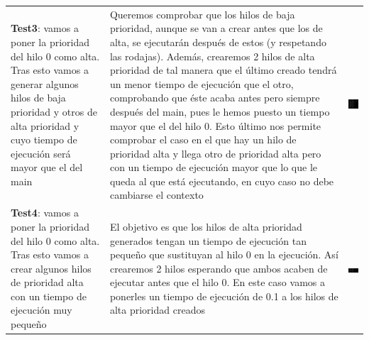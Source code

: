 \documentclass[10pt, spanish, pdftex]{template/UC3M_document}
\begin{document}
\newpage
\begin{table}[h!]
    \centering
    \begin{tabular}{|C{0.15\textwidth}|C{0.4\textwidth}|C{0.35\textwidth}|}
    \hline
     &  &  \\ \hline
    \textbf{Test3}: vamos a poner la prioridad del hilo 0 como alta. Tras esto vamos a generar algunos hilos de baja prioridad y otros de alta prioridad y cuyo tiempo de ejecución será mayor que el del main & Queremos comprobar que los hilos de baja prioridad, aunque se van a crear antes que los de alta, se ejecutarán después de estos (y respetando las rodajas). Además, crearemos 2 hilos de alta prioridad de tal manera que el último creado tendrá un menor tiempo de ejecución que el otro, comprobando que éste acaba antes pero siempre después del main, pues le hemos puesto un tiempo mayor que el del hilo 0. Esto último nos permite comprobar el caso en el que hay un hilo de prioridad alta y llega otro de prioridad alta pero con un tiempo de ejecución mayor que lo que le queda al que está ejecutando, en cuyo caso no debe cambiarse el contexto & \includegraphics[width=5.9cm]{arboles/test3.png} \\ \hline
    \textbf{Test4}: vamos a poner la prioridad del hilo 0 como alta. Tras esto vamos a crear algunos hilos de prioridad alta con un tiempo de ejecución muy pequeño & El objetivo es que los hilos de alta prioridad generados tengan un tiempo de ejecución tan pequeño que sustituyan al hilo 0 en la ejecución. Así crearemos 2 hilos esperando que ambos acaben de ejecutar antes que el hilo 0. En este caso vamos a ponerles un tiempo de ejecución de 0.1 a los hilos de alta prioridad creados & \includegraphics[width=5.5cm]{arboles/test4.png} \\\hline

\end{tabular}
\end{table}
\end{document}
